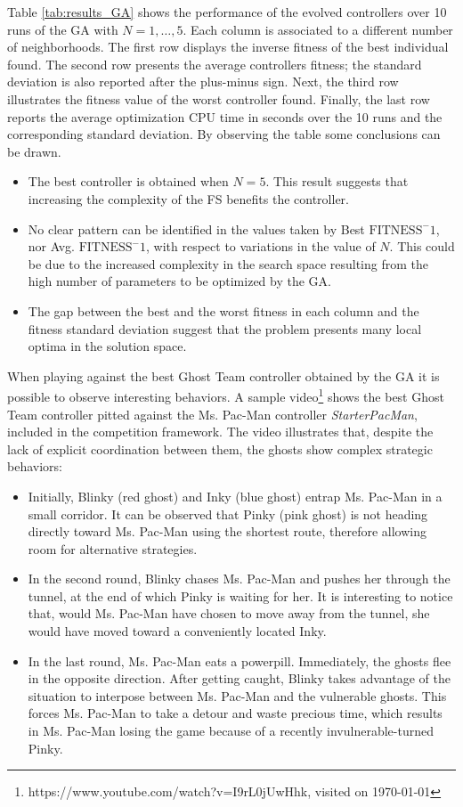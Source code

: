 \documentclass[a4paper]{llncs}
\begin{document}
Table \ref{tab:results_GA} shows the performance of the evolved controllers over 10 runs of the GA with $N=1,\ldots,5$. Each column is associated to a different number of neighborhoods. The first row displays the inverse fitness of the best individual found. The second row presents the average controllers fitness; the standard deviation is also reported after the plus-minus sign. Next, the third row illustrates the fitness value of the worst controller found. Finally, the last row reports the average optimization CPU time in seconds over the 10 runs and the corresponding standard deviation. By observing the table some conclusions can be drawn.

\begin{itemize}
	\item The best controller is obtained when $N=5$. This result suggests that increasing the complexity of the FS benefits the controller.
	\item No clear pattern can be identified in the values taken by Best $\mathrm{FITNESS}^-1$, nor Avg. $\mathrm{FITNESS}^-1$, with respect to variations in the value of $N$. This could be due to the increased complexity in the search space resulting from the high number of parameters to be optimized by the GA.
	\item The gap between the best and the worst fitness in each column and the fitness standard deviation suggest that the problem presents many local optima in the solution space. 
\end{itemize}

When playing against the best Ghost Team controller obtained by the GA it is possible to observe interesting behaviors. A sample video\footnote{https://www.youtube.com/watch?v=I9rL0jUwHhk, visited on {\today}} shows the best Ghost Team controller pitted against the Ms. Pac-Man controller \textit{StarterPacMan}, included in the competition framework. The video illustrates that, despite the lack of explicit coordination between them, the ghosts show complex strategic behaviors:

\begin{itemize}
	\item Initially, Blinky (red ghost) and Inky (blue ghost) entrap Ms. Pac-Man in a small corridor. It can be observed that Pinky (pink ghost) is not heading directly toward Ms. Pac-Man using the shortest route, therefore allowing room for alternative strategies.
	\item In the second round, Blinky chases Ms. Pac-Man and pushes her through the tunnel, at the end of which Pinky is waiting for her. It is interesting to notice that, would Ms. Pac-Man have chosen to move away from the tunnel, she would have moved toward a conveniently located Inky.
	\item In the last round, Ms. Pac-Man eats a powerpill. Immediately, the ghosts flee in the opposite direction. After getting caught, Blinky takes advantage of the situation to interpose between Ms. Pac-Man and the vulnerable ghosts. This forces Ms. Pac-Man to take a detour and waste precious time, which results in Ms. Pac-Man losing the game because of a recently invulnerable-turned Pinky.
\end{itemize} 
\end{document}
